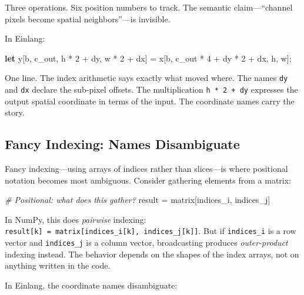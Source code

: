 \documentclass[11pt,titlepage]{article}
\newenvironment{Shaded}{}{}
\newcommand{\CommentTok}[1]{\textcolor[rgb]{0.38,0.63,0.69}{\textit{#1}}}
\newcommand{\DecValTok}[1]{\textcolor[rgb]{0.25,0.63,0.44}{#1}}
\newcommand{\KeywordTok}[1]{\textcolor[rgb]{0.00,0.44,0.13}{\textbf{#1}}}
\newcommand{\NormalTok}[1]{#1}
\newcommand{\OperatorTok}[1]{\textcolor[rgb]{0.40,0.40,0.40}{#1}}
\begin{document}
Three operations. Six position numbers to track. The semantic
claim---``channel pixels become spatial neighbors''---is invisible.

In Einlang:

\begin{Shaded}
\begin{Highlighting}[]
\KeywordTok{let}\NormalTok{ y}\OperatorTok{[}\NormalTok{b, c_out, h * }\DecValTok{2}\NormalTok{ + dy, w * }\DecValTok{2}\NormalTok{ + dx}\OperatorTok{]}\NormalTok{ =}
\NormalTok{    x}\OperatorTok{[}\NormalTok{b, c_out * }\DecValTok{4}\NormalTok{ + dy * }\DecValTok{2}\NormalTok{ + dx, h, w}\OperatorTok{]}\NormalTok{;}
\end{Highlighting}
\end{Shaded}

One line. The index arithmetic says exactly what moved where. The names
\texttt{dy} and \texttt{dx} declare the sub-pixel offsets. The
multiplication \texttt{h\ *\ 2\ +\ dy} expresses the output spatial
coordinate in terms of the input. The coordinate names carry the story.

\vspace{2em}

\hypertarget{fancy-indexing-names-disambiguate}{%
\subsection{Fancy Indexing: Names
Disambiguate}\label{fancy-indexing-names-disambiguate}}

Fancy indexing---using arrays of indices rather than slices---is where
positional notation becomes most ambiguous. Consider gathering elements
from a matrix:

\begin{Shaded}
\begin{Highlighting}[]
\CommentTok{# Positional: what does this gather?}
\NormalTok{result }\OperatorTok{=}\NormalTok{ matrix[indices_i, indices_j]}
\end{Highlighting}
\end{Shaded}

In NumPy, this does \emph{pairwise} indexing:
\texttt{result{[}k{]}\ =\ matrix{[}indices\_i{[}k{]},\ indices\_j{[}k{]}{]}}.
But if \texttt{indices\_i} is a row vector and \texttt{indices\_j} is a
column vector, broadcasting produces \emph{outer-product} indexing
instead. The behavior depends on the shapes of the index arrays, not on
anything written in the code.

In Einlang, the coordinate names disambiguate:
\end{document}

